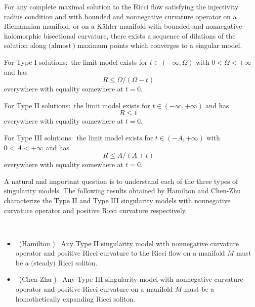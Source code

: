 \begin{corollary}
  \label{cor:cz-restricted-singularity-model-types-under-nonnegative-curvature}
For any complete maximal solution to the Ricci flow satisfying the
injectivity radius condition and with bounded and nonnegative
curvature operator on a Riemannian manifold, or on a K\"ahler
manifold with bounded and nonnegative holomorphic bisectional
curvature, there exists a sequence of dilations of the solution
along $($almost$\,)$ maximum points which converges to a singular
model.

\vskip 0.1cm \noindent For Type {\rm I} solutions:\  the limit
model exists for $t\in (-\infty,\Omega)$ with $0<\Omega<+\infty$
and has
$$
R\leq \Omega/(\Omega-t)
$$
everywhere with equality somewhere at $t=0$.

\vskip 0.1cm \noindent For Type {\rm II} solutions:\ the limit
model exists for $t\in (-\infty, +\infty)$  and has
$$
R\leq 1
$$
everywhere with equality somewhere at $t=0$.

\vskip 0.1cm \noindent For Type {\rm III} solutions:\ the limit
model exists for $t\in(-A, +\infty)$ with $0<A<+\infty$ and has
$$
R\leq A/(A+t)
$$
everywhere with equality somewhere at $t=0$.
\end{corollary}

A natural and important question is to understand each of the three
types of singularity models. The following results obtained by
Hamilton \cite{Ha93E} and Chen-Zhu \cite{CZ00} characterize the Type
II and Type III singularity models with nonnegative curvature
operator and positive Ricci curvature respectively.

\begin{theorem}
  \label{thm:cz-type-ii-models-with-positive-ricci-curvature-are-steady-solitons}
\
\begin{itemize}
\item[(i)] \ {\rm (Hamilton \cite{Ha93E})} \ Any Type {\rm II}
singularity model with nonnegative curvature operator and positive
Ricci curvature to the Ricci flow on a manifold $M$ must be a
$($steady$)$ Ricci soliton. \item[(ii)] \ {\rm (Chen-Zhu
\cite{CZ00})} \ Any Type {\rm III} singularity model with
nonnegative curvature operator and positive Ricci curvature on a
manifold $M$ must be a homothetically expanding Ricci soliton.
\end{itemize}
\end{theorem}

